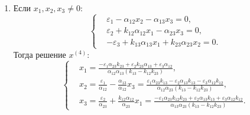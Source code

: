 \begin{enumerate}

        \item Если \( x_1, x_2, x_3 \neq 0 \):
            \[
                \left\{\begin{split}
                    & \varepsilon_1 - \alpha_{12} x_2 - \alpha_{13} x_3 = 0, \\
                    & \varepsilon_2 + k_{12} \alpha_{12} x_1 - \alpha_{23} x_3 = 0, \\
                    & -\varepsilon_3 + k_{13} \alpha_{13} x_1 + k_{23} \alpha_{23} x_2 = 0. 
                \end{split}\right.
            \]
            Тогда решение \( x^{(4)} \):
            \[
                \left\{\begin{split}
                    & x_1 = \frac{-\varepsilon_1 \alpha_{23} k_{23} + \varepsilon_2 k_{23} \alpha_{13} + \varepsilon_3 \alpha_{12}}{\alpha_{12} \alpha_{13} (k_{13} - k_{12} k_{23})}, \\
                    & x_2 = \frac{\varepsilon_1}{\alpha_{12}} - \frac{\alpha_{13}}{\alpha_{12}} x_3
                    = \frac{\varepsilon_1 \alpha_{23} k_{13} - \varepsilon_2 \alpha_{13} k_{13} - \varepsilon_3 \alpha_{12} k_{12}}{\alpha_{12} \alpha_{23} (k_{13} - k_{12} k_{23})}, \\ 
                    & x_3 = \frac{\varepsilon_2}{\alpha_{23}} + \frac{k_{12} \alpha_{12}}{\alpha_{23}} x_1
                    = \frac{-\varepsilon_1 \alpha_{23} k_{12} k_{23} + \varepsilon_2 \alpha_{13} k_{13} + \varepsilon_3 \alpha_{12} k_{12}}{\alpha_{13} \alpha_{23} (k_{13} - k_{12} k_{23})}.
                \end{split}\right.
            \]


\end{enumerate}
